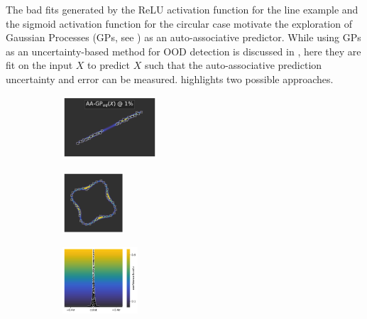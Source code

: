 \noindent The bad fits generated by the ReLU activation function for the line example and the sigmoid activation function for the circular case motivate the exploration of Gaussian Processes (GPs, see ) as an auto-associative predictor. While using GPs as an uncertainty-based method for OOD detection is discussed in , here they are fit on the input $X$ to predict $X$ such that the auto-associative prediction uncertainty and error can be measured.  highlights two possible approaches.

\begin{figure}[H]
    \centering
    \begin{subfigure}
        \centering
        \includegraphics[width=0.388\textwidth,valign=t]{ood-detection/figures/ood-detection/confidence-line-gp-coarse-xx.pdf}
    \end{subfigure}
    \begin{subfigure}
        \centering
        \includegraphics[width=0.254\textwidth,valign=t]{ood-detection/figures/ood-detection/confidence-circle-gp-coarse-xx.pdf}
    \end{subfigure}
    \begin{subfigure}
        \centering
        \includegraphics[width=0.308\textwidth,valign=t]{ood-detection/figures/ood-detection/confidence-haystack-gp-coarse-xx.pdf}
    \end{subfigure}


\end{figure}
